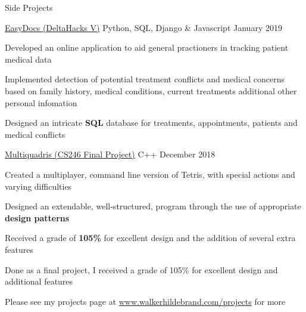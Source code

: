 \documentclass{resume} %
\begin{document}

\begin{rSection}{Side Projects}
    
    \begin{sideproject}
        {\href{https://github.com/wbhildeb/EasyDocs}{\faGithub{} EasyDocs (DeltaHacks V)}}
        {Python, SQL, Django \& Javascript}
        {January 2019}
        {
            \item Developed an online application to aid general practioners in tracking patient medical data
            \item Implemented detection of potential treatment conflicts and medical concerns based on family history, medical conditions, current treatments additional other personal infomation
            \item Designed an intricate \textbf{SQL} database for treatments, appointments, patients and medical conflicts
        }
    \end{sideproject}

    \begin{sideproject}
        {\href{https://github.com/wbhildeb/Multiquadris}{\faGithub{} Multiquadris (CS246 Final Project)}}
        {C++}
        {December 2018}
        {
            \item Created a multiplayer, command line version of Tetris, with special actions and varying difficulties
            \item Designed an extendable, well-structured, program through the use of appropriate \textbf{design patterns}
            \item Received a grade of \textbf{105\%} for excellent design and the addition of several extra features
            \item Done as a final project, I received a grade of 105\% for excellent design and additional features
        }
    \end{sideproject}

    Please see my projects page at \href{http://www.walkerhildebrand.com/projects}{www.walkerhildebrand.com/projects} for more

\end{rSection}

\end{document}
